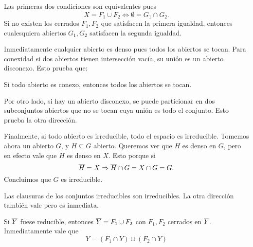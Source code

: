 \documentclass[12pt]{memoir}
\begin{document}
\begin{ptcbp}
  Las primeras dos condiciones son equivalentes pues
  $$X=F_1\cup F_2\iff \emptyset=G_1\cap G_2.$$
  Si no existen los cerrados $F_1,F_2$ que satisfacen la primera igualdad, entonces cualesquiera abiertos $G_1,G_2$ satisfacen la segunda igualdad.\par 
  Inmediatamente cualquier abierto es denso pues todos los abiertos se tocan. Para conexidad si dos abiertos tienen intersección vacía, su unión es un abierto disconexo. Esto prueba que:
  \begin{significant}
    Si todo abierto es conexo, entonces todos los abiertos se tocan.
  \end{significant}
  Por otro lado, si hay un abierto disconexo, se puede particionar en dos subconjuntos abiertos que no se tocan cuya unión es todo el conjunto. Esto prueba la otra dirección.\par 
  Finalmente, si todo abierto es irreducible, todo el espacio es irreducible. Tomemos ahora un abierto $G$, y $H\subseteq G$ abierto. Queremos ver que $H$ es denso en $G$, pero en efecto vale que $H$ es denso en $X$. Esto porque si 
  $$\overline H = X\Rightarrow \overline H\cap G=X\cap G=G.$$
  Concluimos que $G$ es irreducible.
\end{ptcbp}

\begin{Ex}%
  Las clausuras de los conjuntos irreducibles son irreducibles. La otra dirección también vale pero es inmediata.
\end{Ex}

Si $\overline Y$ fuese reducible, entonces $\overline Y=F_1\cup F_2$ con $F_1,F_2$ cerrados en $\overline Y$. Inmediatamente vale que 
$$Y=(F_1\cap Y)\cup(F_2\cap Y)$$
\ifx\nextra\undefined
\printindex
\else\fi
\nocite{*}


\end{document}
